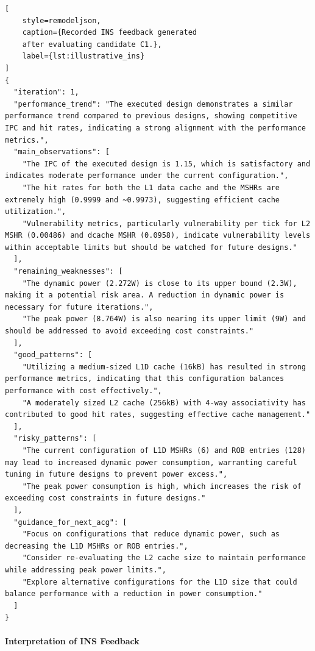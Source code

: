\begin{lstlisting}[
    style=remodeljson,
    caption={Recorded INS feedback generated
    after evaluating candidate C1.},
    label={lst:illustrative_ins}
]
{
  "iteration": 1,
  "performance_trend": "The executed design demonstrates a similar performance trend compared to previous designs, showing competitive IPC and hit rates, indicating a strong alignment with the performance metrics.",
  "main_observations": [
    "The IPC of the executed design is 1.15, which is satisfactory and indicates moderate performance under the current configuration.",
    "The hit rates for both the L1 data cache and the MSHRs are extremely high (0.9999 and ~0.9973), suggesting efficient cache utilization.",
    "Vulnerability metrics, particularly vulnerability per tick for L2 MSHR (0.00486) and dcache MSHR (0.0958), indicate vulnerability levels within acceptable limits but should be watched for future designs."
  ],
  "remaining_weaknesses": [
    "The dynamic power (2.272W) is close to its upper bound (2.3W), making it a potential risk area. A reduction in dynamic power is necessary for future iterations.",
    "The peak power (8.764W) is also nearing its upper limit (9W) and should be addressed to avoid exceeding cost constraints."
  ],
  "good_patterns": [
    "Utilizing a medium-sized L1D cache (16kB) has resulted in strong performance metrics, indicating that this configuration balances performance with cost effectively.",
    "A moderately sized L2 cache (256kB) with 4-way associativity has contributed to good hit rates, suggesting effective cache management."
  ],
  "risky_patterns": [
    "The current configuration of L1D MSHRs (6) and ROB entries (128) may lead to increased dynamic power consumption, warranting careful tuning in future designs to prevent power excess.",
    "The peak power consumption is high, which increases the risk of exceeding cost constraints in future designs."
  ],
  "guidance_for_next_acg": [
    "Focus on configurations that reduce dynamic power, such as decreasing the L1D MSHRs or ROB entries.",
    "Consider re-evaluating the L2 cache size to maintain performance while addressing peak power limits.",
    "Explore alternative configurations for the L1D size that could balance performance with a reduction in power consumption."
  ]
}
\end{lstlisting}

\paragraph{Interpretation of INS Feedback}

